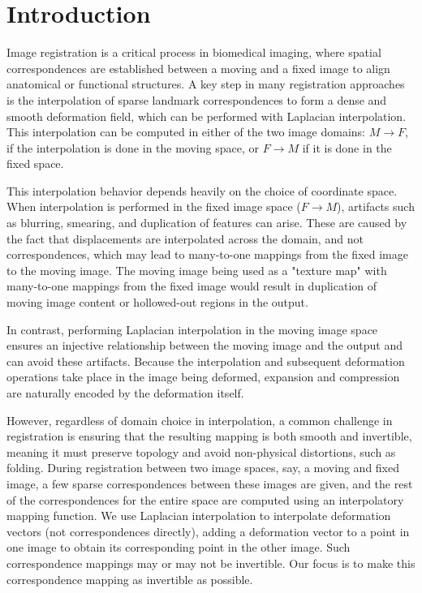 \documentclass[lettersize,journal]{IEEEtran}
\begin{document}
\section{Introduction}

Image registration is a critical process in biomedical imaging, where spatial correspondences are established between a moving and a fixed image to align anatomical or functional structures. A key step in many registration approaches is the interpolation of sparse landmark correspondences to form a dense and smooth deformation field, which can be performed with Laplacian interpolation. This interpolation can be computed in either of the two image domains: $M\rightarrow F$, if the interpolation is done in the moving space, or $F\rightarrow M$ if it is done in the fixed space.

This interpolation behavior depends heavily on the choice of coordinate space. When interpolation is performed in the fixed image space ($F\rightarrow M$), artifacts such as blurring, smearing, and duplication of features can arise. These are caused by the fact that displacements are interpolated across the domain, and not correspondences, which may lead to many-to-one mappings from the fixed image to the moving image. The moving image being used as a "texture map" with many-to-one mappings from the fixed image would result in duplication of moving image content or hollowed-out regions in the output.

In contrast, performing Laplacian interpolation in the moving image space ensures an injective relationship between the moving image and the output and can avoid these artifacts. Because the interpolation and subsequent deformation operations take place in the image being deformed, expansion and compression are naturally encoded by the deformation itself.

However, regardless of domain choice in interpolation, a common challenge in registration is ensuring that the resulting mapping is both smooth and invertible, meaning it must preserve topology and avoid non-physical distortions, such as folding. During registration between two image spaces, say, a moving and fixed image, a few sparse correspondences between these images are given, and the rest of the correspondences for the entire space are computed using an interpolatory mapping function. We use Laplacian interpolation to interpolate deformation vectors (not correspondences directly), adding a deformation vector to a point in one image to obtain its corresponding point in the other image. Such correspondence mappings may or may not be invertible. Our focus is to make this correspondence mapping as invertible as possible. 
\end{document}
